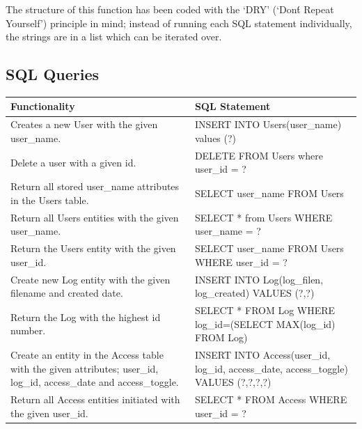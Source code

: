 \documentclass[a4paper]{article}
\begin{document}
The structure of this function has been coded with the `DRY' (`Don\'t Repeat Yourself') principle in mind;
instead of running each SQL statement individually, the strings are in a list which can be iterated over.

\subsection{SQL Queries}

\begin{table}[H]
    \centering
    \begin{tabular}{|p{5cm}|p{8cm}|}
    \hline
    \textbf{Functionality}                                                                                                                   & \textbf{SQL Statement}                                                                                                                                          \\ \hline
    Creates a new User with the given user\_name.                                                                   & INSERT INTO Users(user\_name) values (?)                                         \\ \hline
    Delete a user with a given id.                                                                                  & DELETE FROM Users where user\_id = ?                                             \\ \hline
    Return all stored user\_name attributes in the Users table.                                                     & SELECT user\_name FROM Users                                                     \\ \hline
    Return all Users entities with the given user\_name.                                                            & SELECT * from Users WHERE user\_name = ?                                         \\ \hline
    Return the Users entity with the given user\_id.                                                                & SELECT user\_name FROM Users WHERE user\_id = ?                                  \\ \hline
    Create new Log entity with the given filename and created date.                                                 & INSERT INTO Log(log\_filen, log\_created) VALUES (?,?)                           \\ \hline
    Return the Log with the highest id number.                                                                      & SELECT * FROM Log WHERE log\_id=(SELECT MAX(log\_id) FROM Log)                   \\ \hline
    Create an entity in the Access table with the given attributes; user\_id, log\_id, access\_date and access\_toggle. & INSERT INTO Access(user\_id, log\_id, access\_date, access\_toggle) VALUES (?,?,?,?) \\ \hline
    Return all Access entities initiated with the given user\_id.                                                   & SELECT * FROM Access WHERE user\_id = ?                                          \\ \hline
    \end{tabular}
\end{table}
\end{document}
